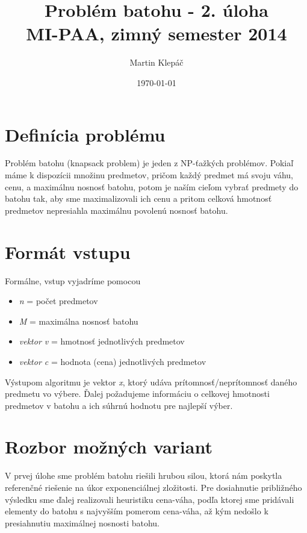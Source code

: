 \documentclass[slovak]{article}
\begin{document}
\title{Problém batohu - 2. úloha \\[5mm] MI-PAA, zimný semester 2014}
\author{Martin Klepáč}
\date{\today}

\maketitle

\section{Definícia problému}

Problém batohu (knapsack problem) je jeden z NP-ťažkých problémov. Pokiaľ máme k dispozícii množinu predmetov, pričom každý predmet má svoju váhu, cenu, a maximálnu nosnosť batohu, potom je naším cieľom vybrať predmety do batohu tak, aby sme maximalizovali ich cenu a pritom celková hmotnosť predmetov nepresiahla maximálnu povolenú nosnosť batohu.

\section{Formát vstupu}

Formálne, vstup vyjadríme pomocou

\begin{itemize}

\item \emph{n} = počet predmetov

\item \emph{M} = maximálna nosnosť batohu

\item \emph{vektor v} = hmotnosť jednotlivých predmetov

\item \emph{vektor c} = hodnota (cena) jednotlivých predmetov

\end{itemize}

Výstupom algoritmu je vektor \emph{x}, ktorý udáva prítomnosť/neprítomnosť daného predmetu vo výbere. Ďalej požadujeme informáciu o celkovej hmotnosti predmetov v batohu a ich súhrnú hodnotu pre najlepší výber.


\section{Rozbor možných variant}

V prvej úlohe sme problém batohu riešili hrubou silou, ktorá nám poskytla referenčné riešenie na úkor exponenciálnej zložitosti. Pre dosiahnutie približného výsledku sme ďalej realizovali heuristiku cena-váha, podľa ktorej sme pridávali elementy do batohu s najvyšším pomerom cena-váha, až kým nedošlo k presiahnutiu maximálnej nosnosti batohu.
\end{document}
